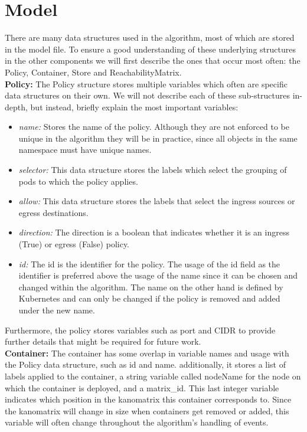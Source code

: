 \section{Model} \label{impl:model} There are many data structures used in the algorithm, most of which are stored in the model file. To ensure a good understanding of these underlying structures in the other components we will first describe the ones that occur most often: the Policy, Container, Store and ReachabilityMatrix.
\\[10pt]

\textbf{Policy:} The Policy structure stores multiple variables which often are specific data structures on their own. We will not describe each of these sub-structures in-depth, but instead, briefly explain the most important variables:
\begin{itemize}
    \renewcommand{\labelitemi}{\scriptsize$\blacksquare$}
    \item \textit{name:} Stores the name of the policy. Although they are not enforced to be unique in the algorithm they will be in practice, since all objects in the same namespace must have unique names. 
    \item \textit{selector:} This data structure stores the labels which select the grouping of pods to which the policy applies.
    \item \textit{allow:} This data structure stores the labels that select the ingress sources or egress destinations.
    \item \textit{direction:} The direction is a boolean that indicates whether it is an ingress (True) or egress (False) policy.
    \item \textit{id:} The id is the identifier for the policy. The usage of the id field as the identifier is preferred above the usage of the name since it can be chosen and changed within the algorithm. The name on the other hand is defined by Kubernetes and can only be changed if the policy is removed and added under the new name.
\end{itemize}
Furthermore, the policy stores variables such as port and CIDR to provide further details that might be required for future work.
\\[10pt]

\textbf{Container:} The container has some overlap in variable names and usage with the Policy data structure, such as id and name. additionally, it stores a list of labels applied to the container, a string variable called nodeName for the node on which the container is deployed, and a matrix\_id. This last integer variable indicates which position in the kanomatrix this container corresponds to. Since the kanomatrix will change in size when containers get removed or added, this variable will often change throughout the algorithm's handling of events.
\\[10pt]

